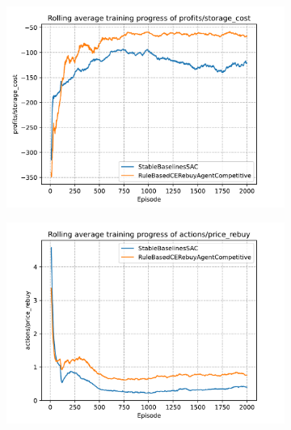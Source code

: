 \begin{figure}[t]
	\centering
	\begin{subfigure}{0.49\textwidth}
		\centering
		\includegraphics[width = \textwidth]{images/experiments/SACDuopoly/SACDuopolyMixedGraphs1.pdf}\\
		\label{fig:SACDuopolyMixedGraphs1}
	\end{subfigure}
	\begin{subfigure}{0.49\textwidth}
		\centering
		\includegraphics[width = \textwidth]{images/experiments/SACDuopoly/SACDuopolyMixedGraphs2.pdf}\\
		\label{fig:SACDuopolyMixedGraphs2}
	\end{subfigure}

\end{figure}
